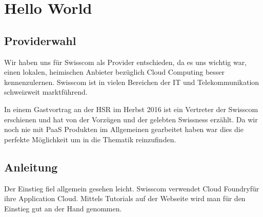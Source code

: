\chapter{Hello World}
\section{Providerwahl}
Wir haben uns für Swisscom als Provider entschieden, da es uns wichtig war, einen lokalen, heimischen Anbieter bezüglich Cloud Computing besser kennenzulernen. Swisscom ist in vielen Bereichen der IT und Telekommunikation schweizweit marktführend. 

In einem Gastvortrag an der HSR im Herbst 2016 ist ein Vertreter der Swisscom erschienen und hat von der Vorzügen und der gelebten Swissness erzählt. Da wir noch nie mit PaaS Produkten im Allgemeinen gearbeitet haben war dies die perfekte Möglichkeit um in die Thematik reinzufinden. 
\section{Anleitung}
Der Einstieg fiel allgemein gesehen leicht. Swisscom verwendet \glqq Cloud Foundry\grqq für ihre Application Cloud. Mittels Tutorials auf der Webseite wird man für den Einstieg gut \glqq an der Hand genommen\grqq .

